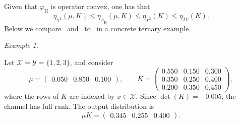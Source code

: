 \documentclass[11pt]{article}
\theoremstyle{plain}
\theoremstyle{remark}
\newtheorem{example}{Example}
\begin{document}
Given that $\varphi_{\mathrm H}$ is operator convex, one has that~\cite{sdpiRaginsky}
\begin{equation}
    \eta_{\chi^2}(\mu ,K) \leq \eta_{\varphi_{\mathrm H}}(\mu,K) \leq \eta_{\chi^2}(K) \leq \eta_{TV}(K). \label{eq:trivialBoundsHellinger}
\end{equation}
Below we compare~ and~ to~ in a concrete ternary example.
\begin{example}
\label{ex:ternaryHellingerImprovement}

Let $\mathcal X=\mathcal Y=\{1,2,3\}$, and consider
\begin{equation}
    \mu
    =
    \begin{pmatrix}
        0.050 & 0.850 & 0.100
    \end{pmatrix},
    \qquad
    K
    =
    \begin{pmatrix}
        0.550 & 0.150 & 0.300\\
        0.350 & 0.250 & 0.400\\
        0.200 & 0.350 & 0.450
    \end{pmatrix},
\end{equation}
where the rows of $K$ are indexed by $x\in\mathcal X$. Since
$\det(K)=-0.005$, the channel has full rank.
The output distribution is
\begin{equation}
    \mu K
    =
    \begin{pmatrix}
        0.345 & 0.255 & 0.400
    \end{pmatrix}.
\end{equation}


\end{example}
\end{document}
